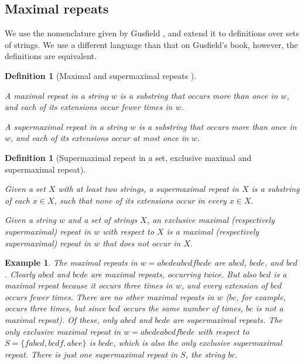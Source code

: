 \documentclass[submission]{dmtcs}
\newcommand\+[1]{\mathcal{#1}}
\newtheorem{definition}[theorem]{Definition}
\newtheorem{example}[theorem]{Example}
\newenvironment{my_enumerate}{\begin{enumerate}
  \setlength{\itemsep}{1pt}
  \setlength{\parskip}{0pt}
  \setlength{\parsep}{0pt}}{\end{enumerate}}
\begin{document}
\subsection{Maximal repeats}

We use the nomenclature given by Gusfield \cite{gusfield}, 
and extend it to definitions over sets of strings. We use a different language
than that on Gusfield's book, however, the definitions are equivalent.

\begin{definition}[Maximal and supermaximal repeats \cite{gusfield}] $ $
\label{def:maximalrepeat}
\begin{my_enumerate}
\item A {\em maximal repeat} in a string $w$ is a 
substring that occurs more
than once in $w$, and each of its extensions occur fewer times in $w$.
\item A {\em supermaximal repeat} in a string $w$ is a 
substring that occurs more
than once in $w$, and each of its extensions occur at most once in $w$. 
\end{my_enumerate}
\end{definition}

\begin{definition}[Supermaximal repeat in a set, exclusive maximal and
supermaximal repeat]
\label{def:exclusive}
\label{def:maximalinset}
 $ $
\begin{my_enumerate}
 \item Given a set $X$ with at least two strings,
 a  supermaximal repeat in $X$  is a substring of each $x\in X$,
 such that none of its extensions occur in every  $x\in X$.
  \item   Given a string $w$ and a set of strings $X$, 
 an {\em exclusive maximal (respectively supermaximal) repeat} in $w$ 
 with respect to $X$  is a maximal (respectively supermaximal) repeat 
 in $w$ that does not occur in $X$. 
 \end{my_enumerate}
\end{definition}


\begin{example}\label{ex:ejemplo}\em
The maximal repeats in  $w=abcdeabcdfbcde$ are $abcd$, $bcde$,
and $bcd $.
Clearly $abcd$ and $bcde$ are maximal repeats, occurring twice. 
But also $bcd$ is a  maximal repeat because it occurs three times 
in $w$, and every extension of $bcd$ occurs fewer times. 
There are no other maximal repeats in $w$ ($bc$, for example,
occurs three times, but since $bcd$ occurs the same number 
of times, $bc$ is not  a maximal repeat). Of these, only
$abcd$ and $bcde$ are supermaximal repeats.
The only exclusive maximal  repeat in $w = abcdeabcdfbcde$
with respect to $S = \{ fabcd, bcdf, abce \}$ is $bcde$, 
which is also the only exclusive supermaximal repeat.
There is just one supermaximal repeat in $S$, the string $bc$.
\end{example}
\end{document}
